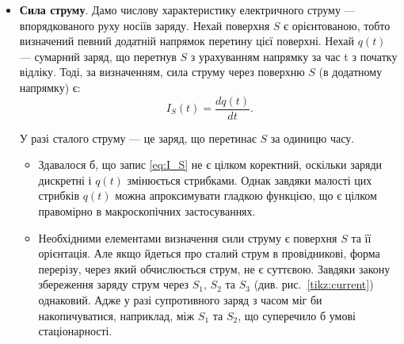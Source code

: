 \begin{itemize}

\item \textbf{Сила струму}. Дамо числову характеристику електричного струму --- впорядкованого руху носіїв заряду.
Нехай поверхня $S$ є орієнтованою, тобто визначений певний додатній
напрямок перетину цієї поверхні. Нехай $q(t)$ --- сумарний заряд, що перетнув $S$ з
урахуванням напрямку за час t з початку відліку. Тоді, за визначенням, сила
струму через поверхню $S$ (в додатному напрямку) є:
\begin{equation}\label{eq:I_S}
    I_S(t) = \frac{dq(t)}{dt}.
\end{equation}

У разі сталого струму --- це заряд, що перетинає $S$ за одиницю часу.


\begin{itemize}
\item  Здавалося б, що запис \eqref{eq:I_S} не є цілком коректний, оскільки заряди дискретні і $q(t)$ змінюється стрибками. Однак завдяки малості цих
стрибків $q(t)$ можна апроксимувати гладкою функцією, що є цілком правомірно в макроскопічних застосуваннях.
\item  Необхідними елементами визначення сили струму є поверхня $S$ та її орієнтація. Але якщо йдеться про сталий струм в провідникові, форма перерізу,
через який обчислюється струм, не є суттєвою. Завдяки закону збереження заряду струм через $S_1$, $S_2$ та $S_3$ (див. рис.~\ref{tikz:current})
однаковий. Адже у
разі супротивного заряд з часом міг би накопичуватися, наприклад, між $S_1$ та $S_2$, що суперечило б умові стаціонарності.
\end{itemize}

\begin{SCfigure}[0.5][h!]
    \centering
\caption{}
\label{tikz:current}
\end{SCfigure}



\end{itemize}
